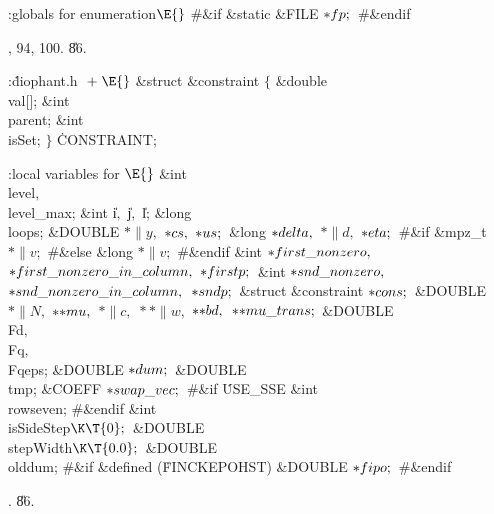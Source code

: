\B{}:globals for enumeration\X${}\E{}$\6
\8\#\&{if} \6
\&{static} \&{FILE} ${}{*}\\{fp};{}$\6
\8\#\&{endif}\par
{}, 94, 100.
\U86.\fi

\Y\B\4:\.{diophant.h }\X${}\mathrel+\E{}$\6
\&{struct} \&{constraint} ${}\{{}$\1\6
\&{double} \\{val}[];\6
\&{int} \\{parent};\6
\&{int} \\{isSet};\2\6
${}\}{}$ \.{CONSTRAINT};\par
\fi

\B{}:local variables for \X${}\E{}$%
\6
\&{int} \\{level}${},{}$ \\{level\_max};\6
\&{int} \|i${},{}$ \|j${},{}$ \|l;\6
\&{long} \\{loops};\6
\&{DOUBLE} ${}{*}\|y,{}$ ${}{*}\\{cs},{}$ ${}{*}\\{us};{}$\6
\&{long} ${}{*}\\{delta},{}$ ${}{*}\|d,{}$ ${}{*}\\{eta};{}$\6
\8\#\&{if} \6
\&{mpz\_t} ${}{*}\|v;{}$\6
\8\#\&{else}\6
\&{long} ${}{*}\|v;{}$\6
\8\#\&{endif}\6
\&{int} ${}{*}\\{first\_nonzero},{}$ ${}{*}\\{first\_nonzero\_in\_column},{}$
${}{*}\\{firstp};{}$\6
\&{int} ${}{*}\\{snd\_nonzero},{}$ ${}{*}\\{snd\_nonzero\_in\_column},{}$
${}{*}\\{sndp};{}$\6
\&{struct} \&{constraint} ${}{*}\\{cons};{}$\6
\&{DOUBLE} ${}{*}\|N,{}$ ${}{*}{*}\\{mu},{}$ ${}{*}\|c,{}$ ${}{*}{*}\|w,{}$
${}{*}{*}\\{bd},{}$ ${}{*}{*}\\{mu\_trans};{}$\6
\&{DOUBLE} \\{Fd}${},{}$ \\{Fq}${},{}$ \\{Fqeps};\6
\&{DOUBLE} ${}{*}\\{dum};{}$\6
\&{DOUBLE} \\{tmp};\6
\&{COEFF} ${}{*}\\{swap\_vec};{}$\6
\8\#\&{if} \.{USE\_SSE}\6
\&{int} \\{rowseven};\6
\8\#\&{endif}\6
\&{int} \\{isSideStep}${}\K\T{0};{}$\6
\&{DOUBLE} \\{stepWidth}${}\K\T{0.0};{}$\6
\&{DOUBLE} \\{olddum};\6
\8\#\&{if} \&{defined} (\.{FINCKEPOHST})\6
\&{DOUBLE} ${}{*}\\{fipo};{}$\6
\8\#\&{endif}\par
{}.
\U86.\fi

